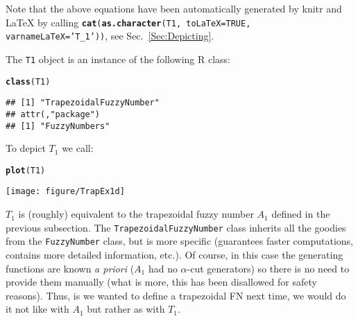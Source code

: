 \documentclass[11pt]{article}\usepackage[]{graphicx}\usepackage[]{color}
\makeatletter
\newcommand{\hlstr}[1]{\textcolor[rgb]{0.192,0.494,0.8}{#1}}%
\newcommand{\hlstd}[1]{\textcolor[rgb]{0.345,0.345,0.345}{#1}}%
\newcommand{\hlkwc}[1]{\textcolor[rgb]{0.333,0.667,0.333}{#1}}%
\newcommand{\hlkwd}[1]{\textcolor[rgb]{0.737,0.353,0.396}{\textbf{#1}}}%
\newenvironment{kframe}{%
 \def\at@end@of@kframe{}%
 \ifinner\ifhmode%
  \def\at@end@of@kframe{\end{minipage}}%
  \begin{minipage}{\columnwidth}%
 \fi\fi%
 \def\FrameCommand##1{\hskip\@totalleftmargin \hskip-\fboxsep
 \colorbox{shadecolor}{##1}\hskip-\fboxsep
     \hskip-\linewidth \hskip-\@totalleftmargin \hskip\columnwidth}%
 \MakeFramed {\advance\hsize-\width
   \@totalleftmargin\z@ \linewidth\hsize
   \@setminipage}}%
 {\par\unskip\endMakeFramed%
 \at@end@of@kframe}
\newenvironment{knitrout}{}{} %
\newcommand{\package}[1]{\textsf{#1}\xspace}
\newcommand{\lang}[1]{\textsf{#1}\xspace}
\newcommand{\R}{\lang{R}}
\newcommand{\func}[1]{\texttt{\hlkwd{#1}}}
\newcommand{\argument}[1]{\texttt{\hlkwc{#1}}}
\newcommand{\str}[1]{\texttt{\hlstr{#1}}}
\makeatother
\begin{document}
\noindent
Note that the above equations have been automatically generated by \package{knitr}
and \LaTeX{} by
calling \texttt{\func{cat}(\func{as.character}(T1, \argument{toLaTeX=}TRUE, \argument{varnameLaTeX=}\str{'{}T\_1'{}}))},
see Sec.~\ref{Sec:Depicting}.

\noindent
The \texttt{T1} object is an instance of the following \R class:

\begin{knitrout}\small
{}\color{fgcolor}\begin{kframe}
\begin{alltt}
\hlkwd{class}\hlstd{(T1)}
\end{alltt}
\begin{verbatim}
## [1] "TrapezoidalFuzzyNumber"
## attr(,"package")
## [1] "FuzzyNumbers"
\end{verbatim}
\end{kframe}
\end{knitrout}

\noindent
To depict $T_1$ we call:

\begin{knitrout}\small
{}\color{fgcolor}\begin{kframe}
\begin{alltt}
\hlkwd{plot}\hlstd{(T1)}
\end{alltt}
\end{kframe}
\end{knitrout}

\begin{center}
\begin{knitrout}\small
{}\color{fgcolor}

{\centering \texttt{[image: figure/TrapEx1d]} 

}



\end{knitrout}
\end{center}





\bigskip
$T_1$ is (roughly) equivalent to the trapezoidal fuzzy number $A_1$
defined in the previous subsection.
The \texttt{Trapezo\-idalFuzzyNumber}
class inherits all the goodies from the \texttt{FuzzyNumber} class,
but is more specific (guarantees faster computations,
contains more detailed information, etc.).
Of course, in this case the generating functions are known \textit{a priori}
($A_1$ had no $\alpha$-cut generators)
so there is no need to provide them manually
(what is more, this has been disallowed for safety reasons).
Thus, is we wanted to define a trapezoidal FN next time, we would
do it not like with $A_1$ but rather as with $T_1$.
\end{document}
